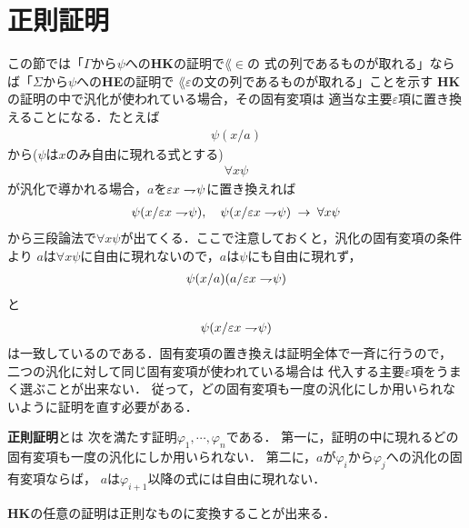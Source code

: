 \section{正則証明}
\label{sec:regular_proof}
	この節では「$\Gamma$から$\psi$への{\bf HK}の証明で$\lang{\in}$の
	式の列であるものが取れる」ならば「$\Sigma$から$\psi$への{\bf HE}の証明で
	$\lang{\varepsilon}$の文の列であるものが取れる」ことを示す
	{\bf HK}の証明の中で汎化が使われている場合，その固有変項は
	適当な主要$\varepsilon$項に置き換えることになる．たとえば
	\begin{align}
		\psi(x/a)
	\end{align}
	から($\psi$は$x$のみ自由に現れる式とする)
	\begin{align}
		\forall x \psi
	\end{align}
	が汎化で導かれる場合，$a$を$\varepsilon x \rightharpoondown\hspace{-0.25em} \psi$に置き換えれば
	\begin{align}
		\psi(x/\varepsilon x \rightharpoondown\hspace{-0.25em} \psi), 
		\quad \psi(x/\varepsilon x \rightharpoondown\hspace{-0.25em} \psi) \hspace{0.25em}\rightarrow\hspace{0.25em} \forall x \psi
	\end{align}
	から三段論法で$\forall x \psi$が出てくる．ここで注意しておくと，汎化の固有変項の条件より
	$a$は$\forall x \psi$に自由に現れないので，$a$は$\psi$にも自由に現れず，
	\begin{align}
		\psi(x/a)(a/\varepsilon x \rightharpoondown\hspace{-0.25em} \psi)
	\end{align}
	と
	\begin{align}
		\psi(x/\varepsilon x \rightharpoondown\hspace{-0.25em} \psi)
	\end{align}
	は一致しているのである．固有変項の置き換えは証明全体で一斉に行うので，
	二つの汎化に対して同じ固有変項が使われている場合は
	代入する主要$\varepsilon$項をうまく選ぶことが出来ない．
	従って，どの固有変項も一度の汎化にしか用いられないように証明を直す必要がある．
	
	\begin{screen}
		\begin{metadfn}[正則証明]
			{\bf 正則証明}とは
			次を満たす証明$\varphi_{1},\cdots,\varphi_{n}$である．
			第一に，証明の中に現れるどの固有変項も一度の汎化にしか用いられない．
			第二に，$a$が$\varphi_{i}$から$\varphi_{j}$への汎化の固有変項ならば，
			$a$は$\varphi_{i+1}$以降の式には自由に現れない．
		\end{metadfn}
	\end{screen}
	
	{\bf HK}の任意の証明は正則なものに変換することが出来る．
	
